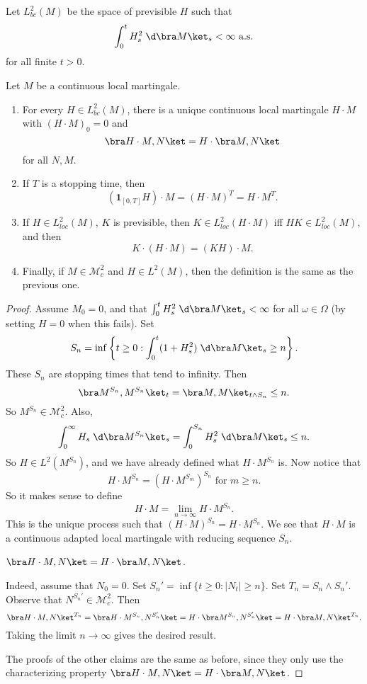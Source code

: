\documentclass[a4paper]{article}
\begin{document}
\begin{defi}[$L_{bc}^2(M)$]
  Let $L_{bc}^2(M)$ be the space of previsible $H$ such that
  \[
    \int_0^t H_s^2 \;\d \bra M\ket_s < \infty\text{ a.s.}
  \]
  for all finite $t > 0$.
\end{defi}

\begin{thm}
  Let $M$ be a continuous local martingale.
  \begin{enumerate}
    \item For every $H \in L_{bc}^2(M)$, there is a unique continuous local martingale $H \cdot M$ with $(H \cdot M)_0= 0 $ and
      \[
        \bra H \cdot M, N\ket = H \cdot \bra M, N\ket
      \]
      for all $N, M$.
    \item If $T$ is a stopping time, then
      \[
        (\mathbf{1}_{[0, T]}H) \cdot M = (H \cdot M)^T = H \cdot M^T.
      \]
    \item If $H \in L^2_{loc}(M)$, $K$ is previsible, then $K \in L^2_{loc}(H \cdot M)$ iff $HK \in L^2_{loc}(M)$, and then
      \[
        K \cdot (H \cdot M) = (KH) \cdot M.
      \]
    \item Finally, if $M \in \mathcal{M}_c^2$ and $H \in L^2(M)$, then the definition is the same as the previous one.
  \end{enumerate}
\end{thm}

\begin{proof}
  Assume $M_0 = 0$, and that $\int_0^t H_s^2 \;\d \bra M\ket_s < \infty$ for all $\omega \in \Omega$ (by setting $H = 0$ when this fails). Set
  \[
    S_n = \inf \left\{ t \geq 0 : \int_0^t (1 + H_s^2) \;\d \bra M \ket_s \geq n\right\}.
  \]
  These $S_n$ are stopping times that tend to infinity. Then
  \[
    \bra M^{S_n}, M^{S_n}\ket_t = \bra M, M\ket_{t \wedge S_n} \leq n.
  \]
  So $M^{S_n} \in \mathcal{M}_c^2$. Also,
  \[
    \int_0^\infty H_s \;\d \bra M^{S_n}\ket_s = \int_0^{S_n} H_s^2 \;\d \bra M\ket_s \leq n.
  \]
  So $H \in L^2(M^{S_n})$, and we have already defined what $H \cdot M^{S_n}$ is. Now notice that
  \[
    H \cdot M^{S_n} = (H \cdot M^{S_m})^{S_n}\text{ for }m \geq n.
  \]
  So it makes sense to define
  \[
    H \cdot M = \lim_{n \to \infty} H \cdot M^{S_n}.
  \]
  This is the unique process such that $(H \cdot M)^{S_n} = H \cdot M^{S_n}$. We see that $H \cdot M$ is a continuous adapted local martingale with reducing sequence $S_n$.
  \begin{claim}
    $\bra H \cdot M, N\ket = H \cdot \bra M, N\ket$.
  \end{claim}
  Indeed, assume that $N_0 = 0$. Set $S_n' = \inf \{t \geq 0: |N_t| \geq n\}$. Set $T_n = S_n \wedge S_n'$. Observe that $N^{S_n'} \in \mathcal{M}_c^2$. Then
  \[
    \bra H \cdot M, N\ket^{T_n} = \bra H \cdot M^{S_n}, N^{S_n'}\ket = H \cdot \bra M^{S_n}, N^{S_n'}\ket = H \cdot \bra M, N\ket^{T_n}.
  \]
  Taking the limit $n \to \infty$ gives the desired result.

  The proofs of the other claims are the same as before, since they only use the characterizing property $\bra H \cdot M, N\ket = H \cdot \bra M, N\ket$.
\end{proof}
\end{document}
